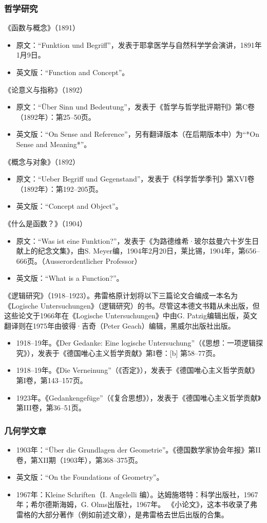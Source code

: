 \subsubsection{哲学研究}  
《函数与概念》（1891）
\begin{itemize}
\item 原文：“Funktion und Begriff”，发表于耶拿医学与自然科学学会演讲，1891年1月9日。  
\item 英文版：“Function and Concept”。
\end{itemize}
《论意义与指称》（1892）
\begin{itemize}
\item 原文：“Über Sinn und Bedeutung”，发表于《哲学与哲学批评期刊》第C卷（1892年）：第25–50页。  
\item 英文版：“On Sense and Reference”，另有翻译版本（在后期版本中）为“*On Sense and Meaning*”。
\end{itemize}
《概念与对象》（1892）
\begin{itemize}
\item 原文：“Ueber Begriff und Gegenstand”，发表于《科学哲学季刊》第XVI卷（1892年）：第192–205页。  
\item 英文版：“Concept and Object”。
\end{itemize}
《什么是函数？》（1904）
\begin{itemize}
\item 原文：“Was ist eine Funktion?”，发表于《为路德维希·玻尔兹曼六十岁生日献上的纪念文集》，由S. Meyer编，1904年2月20日，莱比锡，1904年，第656–666页。（Ausserordentlicher Professor） 
\item 英文版：“What is a Function?”。
\end{itemize}
《逻辑研究》（1918–1923）。弗雷格原计划将以下三篇论文合编成一本名为《Logische Untersuchungen》（逻辑研究）的书。尽管这本德文书籍从未出版，但这些论文于1966年在《Logische Untersuchungen》中由G. Patzig编辑出版，英文翻译则在1975年由彼得·吉奇（Peter Geach）编辑，黑威尔出版社出版。
\begin{itemize}
\item 1918–19年。《Der Gedanke: Eine logische Untersuchung”（《思想：一项逻辑探究》），发表于《德国唯心主义哲学贡献》第I卷：[b] 第58–77页。  
\item 1918–19年。《Die Verneinung”（《否定》），发表于《德国唯心主义哲学贡献》第I卷，第143–157页。  
\item 1923年。《Gedankengefüge”（《复合思想》），发表于《德国唯心主义哲学贡献》第III卷，第36–51页。
\end{itemize}
\subsubsection{几何学文章}  
\begin{itemize}
\item 1903年：“Über die Grundlagen der Geometrie”。《德国数学家协会年报》第II卷，第XII期（1903年），第368–375页。  
\item 英文版：“On the Foundations of Geometry”。
\item 1967年：Kleine Schriften（I. Angelelli 编）。达姆施塔特：科学出版社，1967年；希尔德斯海姆，G. Olms出版社，1967年。  
《小论文》，这本书收录了弗雷格的大部分著作（例如前述文章），是弗雷格去世后出版的合集。
\end{itemize}
